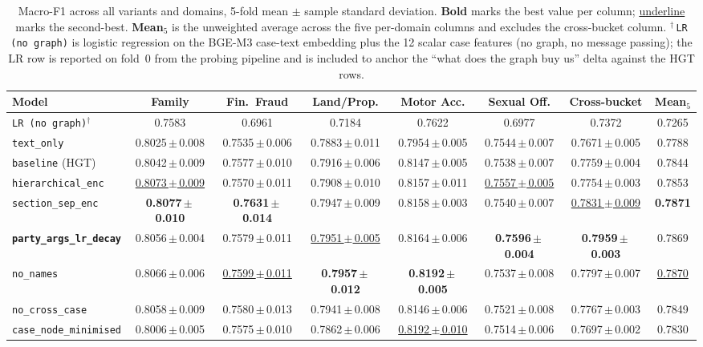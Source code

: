 \begin{table}[H]
  \centering
  \scriptsize
  \setlength{\tabcolsep}{3pt}
  \begin{adjustbox}{max width=\textwidth}
  \begin{tabular}{lccccccc}
    \toprule
    Model & Family & Fin.\ Fraud & Land/Prop. & Motor Acc. & Sexual Off. & Cross-bucket & Mean$_5$ \\
    \midrule
    \texttt{LR (no graph)}$^{\dagger}$ & 0.7583 & 0.6961 & 0.7184 & 0.7622 & 0.6977 & 0.7372 & 0.7265 \\
    \texttt{text\_only} & 0.8025\,$\pm$\,0.008 & 0.7535\,$\pm$\,0.006 & 0.7883\,$\pm$\,0.011 & 0.7954\,$\pm$\,0.005 & 0.7544\,$\pm$\,0.007 & 0.7671\,$\pm$\,0.005 & 0.7788 \\
    \texttt{baseline} (HGT) & 0.8042\,$\pm$\,0.009 & 0.7577\,$\pm$\,0.010 & 0.7916\,$\pm$\,0.006 & 0.8147\,$\pm$\,0.005 & 0.7538\,$\pm$\,0.007 & 0.7759\,$\pm$\,0.004 & 0.7844 \\
    \texttt{hierarchical\_enc} & \underline{0.8073\,$\pm$\,0.009} & 0.7570\,$\pm$\,0.011 & 0.7908\,$\pm$\,0.010 & 0.8157\,$\pm$\,0.011 & \underline{0.7557\,$\pm$\,0.005} & 0.7754\,$\pm$\,0.003 & 0.7853 \\
    \texttt{section\_sep\_enc} & \textbf{0.8077\,$\pm$\,0.010} & \textbf{0.7631\,$\pm$\,0.014} & 0.7947\,$\pm$\,0.009 & 0.8158\,$\pm$\,0.003 & 0.7540\,$\pm$\,0.007 & \underline{0.7831\,$\pm$\,0.009} & \textbf{0.7871} \\
    \textbf{\texttt{party\_args\_lr\_decay}} & 0.8056\,$\pm$\,0.004 & 0.7579\,$\pm$\,0.011 & \underline{0.7951\,$\pm$\,0.005} & 0.8164\,$\pm$\,0.006 & \textbf{0.7596\,$\pm$\,0.004} & \textbf{0.7959\,$\pm$\,0.003} & 0.7869 \\
    \texttt{no\_names} & 0.8066\,$\pm$\,0.006 & \underline{0.7599\,$\pm$\,0.011} & \textbf{0.7957\,$\pm$\,0.012} & \textbf{0.8192\,$\pm$\,0.005} & 0.7537\,$\pm$\,0.008 & 0.7797\,$\pm$\,0.007 & \underline{0.7870} \\
    \texttt{no\_cross\_case} & 0.8058\,$\pm$\,0.009 & 0.7580\,$\pm$\,0.013 & 0.7941\,$\pm$\,0.008 & 0.8146\,$\pm$\,0.006 & 0.7521\,$\pm$\,0.008 & 0.7767\,$\pm$\,0.003 & 0.7849 \\
    \texttt{case\_node\_minimised} & 0.8006\,$\pm$\,0.005 & 0.7575\,$\pm$\,0.010 & 0.7862\,$\pm$\,0.006 & \underline{0.8192\,$\pm$\,0.010} & 0.7514\,$\pm$\,0.006 & 0.7697\,$\pm$\,0.002 & 0.7830 \\
    \bottomrule
  \end{tabular}
  \end{adjustbox}
  \caption{Macro-F1 across all variants and domains, 5-fold mean
  $\pm$ sample standard deviation. \textbf{Bold} marks the best
  value per column; \underline{underline} marks the second-best.
  \textbf{Mean$_5$} is the unweighted average across the five
  per-domain columns and excludes the cross-bucket column.
  $^{\dagger}$\,\texttt{LR (no graph)} is logistic regression on the
  BGE-M3 case-text embedding plus the 12 scalar case features (no
  graph, no message passing); the LR row is reported on fold~0 from
  the probing pipeline and is included to anchor the ``what does the
  graph buy us'' delta against the HGT rows.}
  \label{tab:cross_bucket_results}
\end{table}

